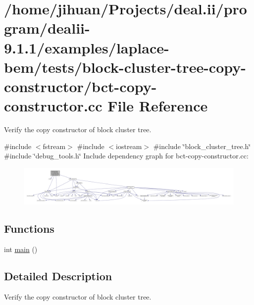 \hypertarget{bct-copy-constructor_8cc}{}\section{/home/jihuan/\+Projects/deal.ii/program/dealii-\/9.1.1/examples/laplace-\/bem/tests/block-\/cluster-\/tree-\/copy-\/constructor/bct-\/copy-\/constructor.cc File Reference}
\label{bct-copy-constructor_8cc}


Verify the copy constructor of block cluster tree.  


{\ttfamily \#include $<$fstream$>$}\newline
{\ttfamily \#include $<$iostream$>$}\newline
{\ttfamily \#include \char`\"{}block\+\_\+cluster\+\_\+tree.\+h\char`\"{}}\newline
{\ttfamily \#include \char`\"{}debug\+\_\+tools.\+h\char`\"{}}\newline
Include dependency graph for bct-\/copy-\/constructor.cc\+:
\nopagebreak
\begin{figure}[H]
\begin{center}
\leavevmode
\includegraphics[width=350pt]{bct-copy-constructor_8cc__incl}
\end{center}
\end{figure}
\subsection*{Functions}
\begin{DoxyCompactItemize}
\item 
int \hyperlink{bct-copy-constructor_8cc_ae66f6b31b5ad750f1fe042a706a4e3d4}{main} ()
\end{DoxyCompactItemize}


\subsection{Detailed Description}
Verify the copy constructor of block cluster tree. 

